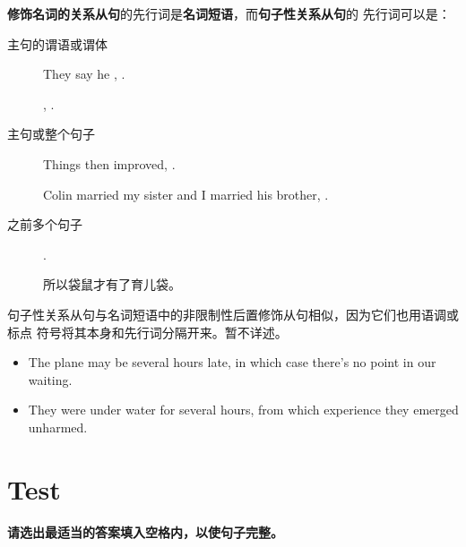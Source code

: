 \textbf{修饰名词的关系从句}的先行词是\textbf{名词短语}，而\textbf{句子性关系从句}的
先行词可以是：
\begin{description}
\item[主句的谓语或谓体] They say he , .

  , .

\item[主句或整个句子] Things then improved, .

  Colin married my sister and I married his brother, .

\item[之前多个句子] .

  所以袋鼠才有了育儿袋。

\end{description}

句子性关系从句与名词短语中的非限制性后置修饰从句相似，因为它们也用语调或标点
符号将其本身和先行词分隔开来。暂不详述。
\begin{itemize}
\item The plane may be several hours late, in which case there's no point in our waiting.

\item They were under water for several hours, from which experience they
  emerged unharmed.
\end{itemize}


\section{Test}

\paragraph{请选出最适当的答案填入空格内，以使句子完整。}

